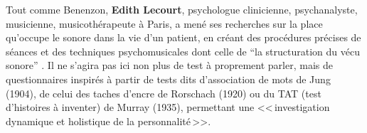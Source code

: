 

   Tout comme Benenzon, \textbf{Edith Lecourt}, psychologue clinicienne,
      psychanalyste, musicienne, musicothérapeute à Paris, a mené ses recherches sur la place qu'occupe le sonore dans la vie d'un
        patient, en créant des procédures précises de séances et des techniques psychomusicales dont celle de \enquote{la structuration du vécu sonore} \autocite[p.119] {lecourt_les_2017}.
        Il ne s'agira pas ici non plus de test à proprement parler, mais de questionnaires inspirés à partir de tests dits
        d'association de mots de Jung (1904), de celui des taches
        d'encre de Rorschach (1920) ou du TAT (test d'histoires à
        inventer) de Murray (1935), permettant une <<\,investigation dynamique et holistique de la
              personnalité\,>>\autocite[p.~13] {anzieu.chabert:methodes}.









